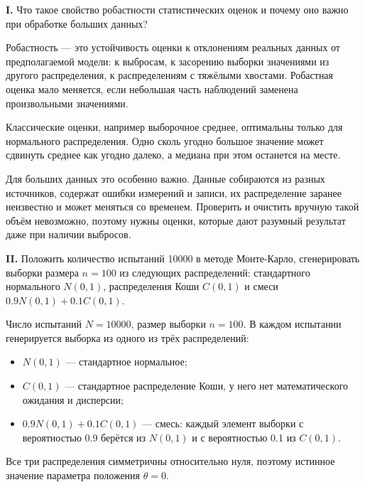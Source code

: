 \documentclass{article}
\begin{document}
\begin{framed}
    \textbf{I.} Что такое свойство робастности статистических оценок и почему оно важно
    при обработке больших данных?
\end{framed}
    Робастность --- это устойчивость оценки к отклонениям реальных данных от предполагаемой модели: к выбросам, к засорению выборки значениями из другого распределения, к распределениям с тяжёлыми хвостами. Робастная оценка мало меняется, если небольшая часть наблюдений заменена произвольными значениями.

    Классические оценки, например выборочное среднее, оптимальны только для нормального распределения. Одно сколь угодно большое значение может сдвинуть среднее как угодно далеко, а медиана при этом останется на месте.

    Для больших данных это особенно важно. Данные собираются из разных источников, содержат ошибки измерений и записи, их распределение заранее неизвестно и может меняться со временем. Проверить и очистить вручную такой объём невозможно, поэтому нужны оценки, которые дают разумный результат даже при наличии выбросов.

\begin{framed}
    \textbf{II.} Положить количество испытаний 10000 в методе Монте-Карло, сгенерировать выборки
    размера $n=100$ из следующих распределений: стандартного нормального $N(0,1)$,
    распределения Коши $C(0,1)$ и смеси $0.9N(0,1)+0.1C(0,1)$.
\end{framed}
    Число испытаний $N=10000$, размер выборки $n=100$. В каждом испытании генерируется выборка из одного из трёх распределений:
    \begin{itemize}
        \item $N(0,1)$ --- стандартное нормальное;
        \item $C(0,1)$ --- стандартное распределение Коши, у него нет математического ожидания и дисперсии;
        \item $0.9N(0,1)+0.1C(0,1)$ --- смесь: каждый элемент выборки с вероятностью 0.9 берётся из $N(0,1)$ и с вероятностью 0.1 из $C(0,1)$.
    \end{itemize}
    Все три распределения симметричны относительно нуля, поэтому истинное значение параметра положения $\theta=0$.
\end{document}

